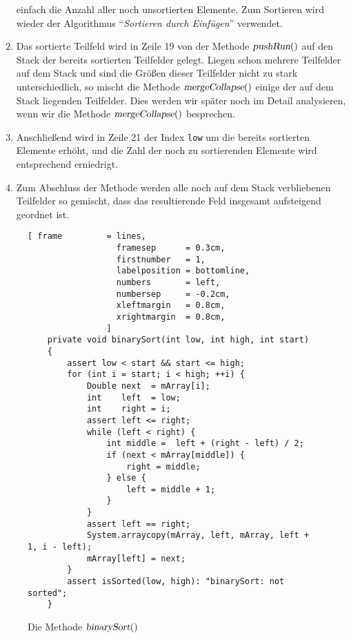 \begin{enumerate}
      einfach die Anzahl aller noch unsortierten Elemente.
      Zum Sortieren wird wieder der Algorithmus ``\emph{Sortieren durch Einf\"ugen}'' verwendet.
\item Das sortierte Teilfeld  wird in Zeile 19 von der Methode $\textsl{pushRun}()$ auf den Stack der bereits
      sortierten Teilfelder gelegt.  Liegen schon mehrere Teilfelder auf dem Stack und sind die
      Gr\"o{\ss}en dieser Teilfelder nicht zu stark unterschiedlich, so mischt die Methode
      $\textsl{mergeCollapse}()$ einige der auf dem Stack liegenden Teilfelder.  Dies
      werden wir sp\"ater noch im Detail analysieren, wenn wir die Methode $\textsl{mergeCollapse}()$
      besprechen.
\item Anschlie{\ss}end wird in Zeile 21 der Index \texttt{low} um die bereits sortierten Elemente erh\"oht,
      und die Zahl der noch zu sortierenden Elemente wird entsprechend erniedrigt.
\item Zum Abschluss der Methode werden alle noch auf dem Stack verbliebenen Teilfelder so
      gemischt, dass das resultierende Feld insgesamt aufsteigend geordnet ist.
\end{enumerate}

\begin{figure}[!ht]
\centering
\begin{Verbatim}[ frame         = lines, 
                  framesep      = 0.3cm, 
                  firstnumber   = 1,
                  labelposition = bottomline,
                  numbers       = left,
                  numbersep     = -0.2cm,
                  xleftmargin   = 0.8cm,
                  xrightmargin  = 0.8cm,
                ]
    private void binarySort(int low, int high, int start) 
    {
        assert low < start && start <= high;
        for (int i = start; i < high; ++i) {
            Double next  = mArray[i];
            int    left  = low;
            int    right = i;
            assert left <= right;
            while (left < right) {
                int middle =  left + (right - left) / 2;
                if (next < mArray[middle]) {
                    right = middle;
                } else {
                    left = middle + 1;
                }
            }
            assert left == right;
            System.arraycopy(mArray, left, mArray, left + 1, i - left);
            mArray[left] = next;
        }
        assert isSorted(low, high): "binarySort: not sorted";
    }
\end{Verbatim}
\vspace*{-0.3cm}
\caption{Die Methode $\textsl{binarySort}()$}
\label{fig:TimSort.java:binarySort}
\end{figure}

